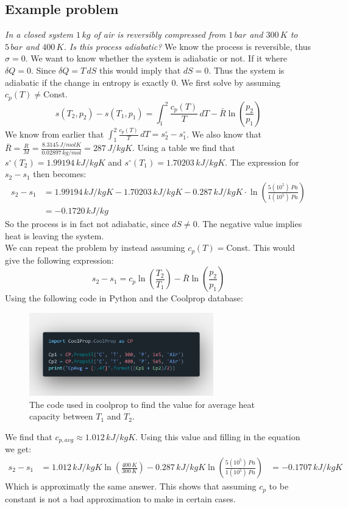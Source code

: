 \documentclass[11pt, a4paper]{article}
\begin{document}
\subsection{Example problem}
\textit{In a closed system $1\,kg$ of air is reversibly compressed from $1\,bar$ and $300\,K$ to $5\,bar$ and $400\,K$. Is this process adiabatic?}
We know the process is reversible, thus $\sigma = 0$. We want to know whether the system is adiabatic or not. If it where $\delta Q = 0$. Since $\delta Q = T\,dS$ this would imply that $dS = 0$. Thus the system is adiabatic if the change in entropy is exactly $0$.
We first solve by assuming $c_p(T) \neq$Const.
\begin{equation*}
  s(T_2, p_2) - s(T_1, p_1) = \int_1^2 \frac{c_p(T)}{T}\,dT - \bar{R}\ln\left( \frac{p_2}{p_1} \right)
\end{equation*}
We know from earlier that $\int_1^2 \frac{c_p(T)}{T}\,dT = s_2^\circ - s_1^\circ$. We also know that $\bar{R} = \frac{R}{M} = \frac{8.3145\,J/molK}{0.02897\,kg/mol} = 287\,J/kgK$. Using a table we find that $s^\circ(T_2) = 1.99194\,kJ/kgK$ and $s^\circ(T_1) = 1.70203\,kJ/kgK$. The expression for $s_2 - s_1$ then becomes:
\begin{align*}
  s_2 - s_1 &= 1.99194\,kJ/kgK - 1.70203\,kJ/kgK - 0.287\,kJ/kgK\cdot \ln\left( \frac{5(10^5)\,Pa}{1(10^5)\,Pa} \right)\\
  &= -0.1720\,kJ/kg
\end{align*}
So the process is in fact not adiabatic, since $dS \neq 0$. The negative value implies heat is leaving the system.\\
We can repeat the problem by instead assuming $c_p(T)=$Const. This would give the following expression:
\begin{equation*}
  s_2 - s_1 = c_p\ln\left(\frac{T_2}{T_1}\right) - \bar{R}\ln\left(\frac{p_2}{p_1}\right)
\end{equation*}
Using the following code in Python and the Coolprop database:
\begin{figure}[h]
  \centerline{\includegraphics[width=80mm]{images/code.png}}
  \caption{The code used in coolprop to find the value for average heat capacity between $T_1$ and $T_2$.}
\end{figure}
We find that $c_{p, avg} \approx 1.012\,kJ/kgK$. Using this value and filling in the equation we get:
\begin{align*}
  s_2 - s_1 &= 1.012\,kJ/kgK\ln\left(\frac{400\,K}{300\,K}\right) - 0.287\,kJ/kgK\ln\left( \frac{5(10^5)\,Pa}{1(10^5)\,Pa}\right)
  &= -0.1707\,kJ/kgK
\end{align*}
Which is approximatly the same answer. This shows that assuming $c_p$ to be constant is not a bad approximation to make in certain cases.
\end{document}
